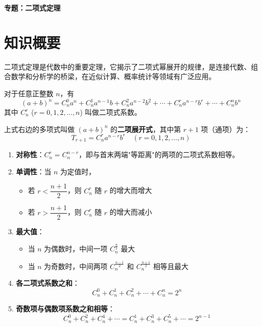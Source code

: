 \documentclass[11pt]{ctexrep}
\begin{document}
\begin{center}
    {\LARGE\bfseries 专题：二项式定理}
\end{center}

\section*{知识概要}

二项式定理是代数中的重要定理，它揭示了二项式幂展开的规律，是连接代数、组合数学和分析学的桥梁，在近似计算、概率统计等领域有广泛应用。

\begin{definition}[二项式定理]
    对于任意正整数 $n$，有
    \[
        (a+b)^n = C_n^0 a^n + C_n^1 a^{n-1}b + C_n^2 a^{n-2}b^2 + \cdots + C_n^r a^{n-r}b^r + \cdots + C_n^n b^n
    \]
    其中 $C_n^r$ ($r = 0, 1, 2, \ldots, n$) 叫做二项式系数。
    
    上式右边的多项式叫做 $(a+b)^n$ 的\textbf{二项展开式}，其中第 $r+1$ 项（通项）为：
    \[
        T_{r+1} = C_n^r a^{n-r}b^r \quad (r = 0, 1, 2, \ldots, n)
    \]
\end{definition}

\begin{property}[二项式系数的性质]
    \begin{enumerate}
        \item \textbf{对称性}：$C_n^r = C_n^{n-r}$，即与首末两端"等距离"的两项的二项式系数相等。
        
        \item \textbf{单调性}：当 $n$ 为定值时，
        \begin{itemize}
            \item 若 $r < \dfrac{n+1}{2}$，则 $C_n^r$ 随 $r$ 的增大而增大
            \item 若 $r > \dfrac{n+1}{2}$，则 $C_n^r$ 随 $r$ 的增大而减小
        \end{itemize}
        
        \item \textbf{最大值}：
        \begin{itemize}
            \item 当 $n$ 为偶数时，中间一项 $C_n^{\frac{n}{2}}$ 最大
            \item 当 $n$ 为奇数时，中间两项 $C_n^{\frac{n-1}{2}}$ 和 $C_n^{\frac{n+1}{2}}$ 相等且最大
        \end{itemize}
        
        \item \textbf{各二项式系数之和}：
        \[
            C_n^0 + C_n^1 + C_n^2 + \cdots + C_n^n = 2^n
        \]
        
        \item \textbf{奇数项与偶数项系数之和相等}：
        \[
            C_n^0 + C_n^2 + C_n^4 + \cdots = C_n^1 + C_n^3 + C_n^5 + \cdots = 2^{n-1}
        \]
    \end{enumerate}
\end{property}
\end{document}
